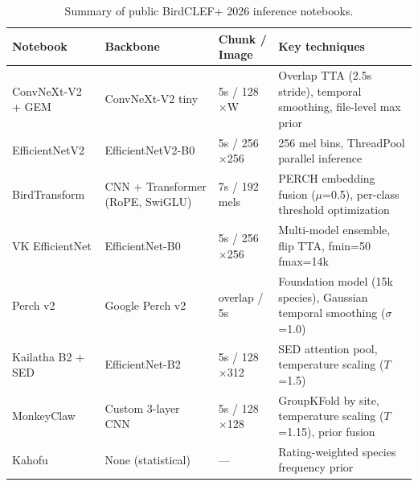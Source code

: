 \begin{table}[h]
\centering
\caption{Summary of public BirdCLEF+ 2026 inference notebooks.}
\label{tab:landscape}
\small
\begin{tabular}{p{3.2cm}p{2.8cm}p{2.2cm}p{4.5cm}}
\hline
\textbf{Notebook} & \textbf{Backbone} & \textbf{Chunk / Image} & \textbf{Key techniques} \\
\hline
ConvNeXt-V2 + GEM & ConvNeXt-V2 tiny & 5s / 128$\times$W & Overlap TTA (2.5s stride), temporal smoothing, file-level max prior \\
EfficientNetV2 & EfficientNetV2-B0 & 5s / 256$\times$256 & 256 mel bins, ThreadPool parallel inference \\
BirdTransform & CNN + Transformer (RoPE, SwiGLU) & 7s / 192 mels & PERCH embedding fusion ($\mu$=0.5), per-class threshold optimization \\
VK EfficientNet & EfficientNet-B0 & 5s / 256$\times$256 & Multi-model ensemble, flip TTA, fmin=50 fmax=14k \\
Perch v2 & Google Perch v2 & overlap / 5s & Foundation model (15k species), Gaussian temporal smoothing ($\sigma$=1.0) \\
Kailatha B2 + SED & EfficientNet-B2 & 5s / 128$\times$312 & SED attention pool, temperature scaling ($T$=1.5) \\
MonkeyClaw & Custom 3-layer CNN & 5s / 128$\times$128 & GroupKFold by site, temperature scaling ($T$=1.15), prior fusion \\
Kahofu & None (statistical) & --- & Rating-weighted species frequency prior \\
\hline
\end{tabular}
\end{table}

